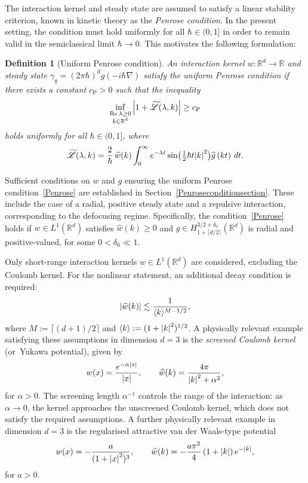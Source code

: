 \documentclass[JEP,XML,SOM,Unicode]{cedram}
\theoremstyle{plain}
\newtheorem{definition}[theorem]{Definition}
\theoremstyle{remark}
\newcommand{\br}[1]{\left(#1\right)}
\newcommand{\bbr}[1]{\bigl(#1 \bigr)}
\newcommand{\ak}{\abs{k}}
\newcommand{\jb}[1]{\langle#1\rangle}
\newcommand{\R}{\mathbb{R}}
\newcommand{\lam}{\lambda}
\begin{document}
The interaction kernel and steady state are assumed to satisfy a linear stability criterion, known in kinetic theory as the \textit{Penrose condition}. In the present setting, the condition must hold uniformly for all $\hbar \in (0,1]$ in order to remain valid in the semiclassical limit $\hbar \to 0$. This motivates the following formulation:

\begin{definition}[Uniform Penrose condition]
An interaction kernel \(w\colon \R^d \to \R\) and steady state \(\gamma_g = (2\pi\hbar)^d g(-i\hbar\nabla)\) satisfy the uniform Penrose condition if there exists a constant \({c_{\mathrm{P}}} > 0\) such that the inequality
\begin{align}\label{Penrose}
\inf_{\substack{\Re\lambda \geq 0 \\ k \in \R^d}} \abs{1 + \widetilde{\mathscr{L}}(\lambda, k)} \geq {c_{\mathrm{P}}}
\end{align}
holds uniformly for all \(\hbar \in (0,1]\), where
\[
\widetilde{\mathscr{L}}(\lambda, k) = \frac{2}{\hbar}\, \widehat{w}(k) \int_0^\infty e^{-\lam t}\sin\bbr{\tfrac{1}{2}\hbar t \ak^2} \widehat{g}\br{kt}\,dt.
\]

\end{definition}
Sufficient conditions on $w$ and $g$ ensuring the uniform Penrose condition~\eqref{Penrose} are established in Section~\ref{Penroseconditionsection}. These include the case of a radial, positive steady state and a repulsive interaction, corresponding to the defocusing regime. Specifically, the condition~\eqref{Penrose} holds if \( w \in L^1(\R^d) \) satisfies \( \widehat{w}(k) \geq 0 \) and \( g \in H^{3/2+\delta_0}_{1+\lceil d/2 \rceil}(\R^d) \) is radial and positive-valued, for some \( 0 < \delta_0 \ll 1 \).

Only short-range interaction kernels \( w \in L^1(\R^d) \) are considered, excluding the Coulomb kernel. For the nonlinear statement, an additional decay condition is required:
\[
\abs{\widehat{w}(k)} \lesssim \frac{1}{\jb{k}^{M-1/2}},
\]
where \( M := \lceil (d+1)/2 \rceil \) and \( \jb{k} := (1 + \abs{k}^2)^{1/2} \). A physically relevant example satisfying these assumptions in dimension \( d = 3 \) is the \textit{screened Coulomb kernel} (or~Yukawa potential), given by
\[
w(x) = \frac{e^{-\alpha\abs{x}}}{\abs{x}}, \qquad \widehat{w}(k) = \frac{4\pi}{\abs{k}^2 + \alpha^2},
\]
for \( \alpha > 0 \). The screening length \( \alpha^{-1} \) controls the range of the interaction: as \( \alpha \to 0 \), the kernel approaches the unscreened Coulomb kernel, which does not satisfy the required assumptions. A further physically relevant example in dimension $d=3$ is the regularised attractive van der Waals-type potential
\[w(x)=-\frac{a}{(1+\abs{x}^2)^3},\qquad \widehat w(k)=-\frac{a\pi^2}{4}\br{1+\ak}e^{-\ak},\]
for $a>0$.
\end{document}
